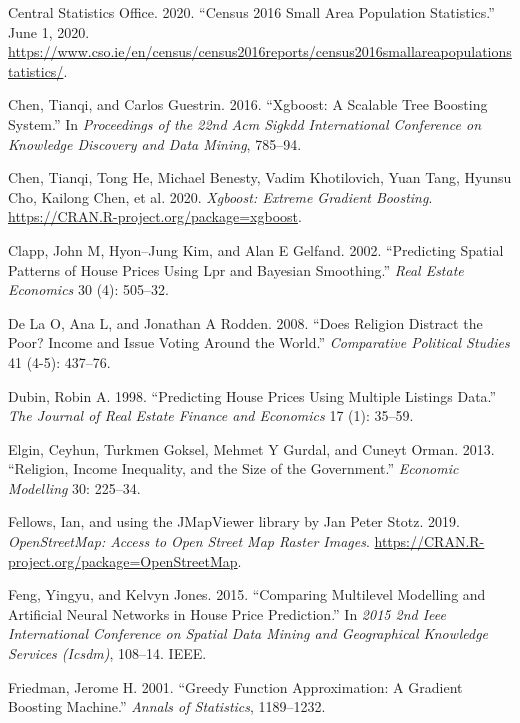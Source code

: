 \documentclass[conference,final,]{IEEEtran}
\newlength{\cslhangindent}
\newenvironment{cslreferences}%
  {\setlength{\parindent}{0pt}%
  \everypar{\setlength{\hangindent}{\cslhangindent}}\ignorespaces}%
  {\par}
\begin{document}
\begin{cslreferences}
\leavevmode\hypertarget{ref-cso2020}{}%
Central Statistics Office. 2020. ``Census 2016 Small Area Population Statistics.'' June 1, 2020. \url{https://www.cso.ie/en/census/census2016reports/census2016smallareapopulationstatistics/}.

\leavevmode\hypertarget{ref-chen2016xgboost}{}%
Chen, Tianqi, and Carlos Guestrin. 2016. ``Xgboost: A Scalable Tree Boosting System.'' In \emph{Proceedings of the 22nd Acm Sigkdd International Conference on Knowledge Discovery and Data Mining}, 785--94.

\leavevmode\hypertarget{ref-R-xgboost}{}%
Chen, Tianqi, Tong He, Michael Benesty, Vadim Khotilovich, Yuan Tang, Hyunsu Cho, Kailong Chen, et al. 2020. \emph{Xgboost: Extreme Gradient Boosting}. \url{https://CRAN.R-project.org/package=xgboost}.

\leavevmode\hypertarget{ref-clapp2002predicting}{}%
Clapp, John M, Hyon--Jung Kim, and Alan E Gelfand. 2002. ``Predicting Spatial Patterns of House Prices Using Lpr and Bayesian Smoothing.'' \emph{Real Estate Economics} 30 (4): 505--32.

\leavevmode\hypertarget{ref-de2008does}{}%
De La O, Ana L, and Jonathan A Rodden. 2008. ``Does Religion Distract the Poor? Income and Issue Voting Around the World.'' \emph{Comparative Political Studies} 41 (4-5): 437--76.

\leavevmode\hypertarget{ref-dubin1998predicting}{}%
Dubin, Robin A. 1998. ``Predicting House Prices Using Multiple Listings Data.'' \emph{The Journal of Real Estate Finance and Economics} 17 (1): 35--59.

\leavevmode\hypertarget{ref-elgin2013religion}{}%
Elgin, Ceyhun, Turkmen Goksel, Mehmet Y Gurdal, and Cuneyt Orman. 2013. ``Religion, Income Inequality, and the Size of the Government.'' \emph{Economic Modelling} 30: 225--34.

\leavevmode\hypertarget{ref-R-OpenStreetMap}{}%
Fellows, Ian, and using the JMapViewer library by Jan Peter Stotz. 2019. \emph{OpenStreetMap: Access to Open Street Map Raster Images}. \url{https://CRAN.R-project.org/package=OpenStreetMap}.

\leavevmode\hypertarget{ref-feng2015comparing}{}%
Feng, Yingyu, and Kelvyn Jones. 2015. ``Comparing Multilevel Modelling and Artificial Neural Networks in House Price Prediction.'' In \emph{2015 2nd Ieee International Conference on Spatial Data Mining and Geographical Knowledge Services (Icsdm)}, 108--14. IEEE.

\leavevmode\hypertarget{ref-friedman2001greedy}{}%
Friedman, Jerome H. 2001. ``Greedy Function Approximation: A Gradient Boosting Machine.'' \emph{Annals of Statistics}, 1189--1232.


\end{cslreferences}
\end{document}
